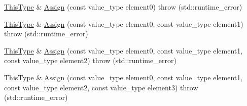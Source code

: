 {\bf }\par
\begin{DoxyCompactItemize}
\item 
\hyperlink{classvct_fixed_size_const_vector_base_a071063bc4fa43112cc287b2dbef53180}{This\+Type} \& \hyperlink{classvct_fixed_size_vector_base_a7e000228178f531cc2170f492927492a}{Assign} (const value\+\_\+type element0)  throw (std\+::runtime\+\_\+error)
\item 
\hyperlink{classvct_fixed_size_const_vector_base_a071063bc4fa43112cc287b2dbef53180}{This\+Type} \& \hyperlink{classvct_fixed_size_vector_base_aaf475cb08bd2963feb6d6c7276a696c4}{Assign} (const value\+\_\+type element0, const value\+\_\+type element1)  throw (std\+::runtime\+\_\+error)
\item 
\hyperlink{classvct_fixed_size_const_vector_base_a071063bc4fa43112cc287b2dbef53180}{This\+Type} \& \hyperlink{classvct_fixed_size_vector_base_adaa16d9bad66a6ee48558f7919d47f47}{Assign} (const value\+\_\+type element0, const value\+\_\+type element1, const value\+\_\+type element2)  throw (std\+::runtime\+\_\+error)
\item 
\hyperlink{classvct_fixed_size_const_vector_base_a071063bc4fa43112cc287b2dbef53180}{This\+Type} \& \hyperlink{classvct_fixed_size_vector_base_aa65048e7e42415f7e520629378147dbb}{Assign} (const value\+\_\+type element0, const value\+\_\+type element1, const value\+\_\+type element2, const value\+\_\+type element3)  throw (std\+::runtime\+\_\+error)
\end{DoxyCompactItemize}

